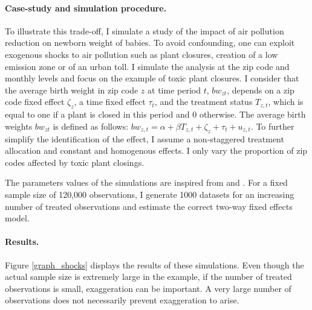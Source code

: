 \documentclass[usletter, 12pt]{article}
\begin{document}
			\paragraph{Case-study and simulation procedure.} %
			To illustrate this trade-off, I simulate a study of the impact of air pollution reduction on newborn weight of babies. To avoid confounding, one can exploit exogenous shocks to air pollution such as plant closures, creation of a low emission zone or of an urban toll. I simulate the analysis at the zip code and monthly levels and focus on the example of toxic plant closures. I consider that the average birth weight in zip code $z$ at time period $t$, $bw_{zt}$, depends on a zip code fixed effect $\zeta_z$, a time fixed effect $\tau_t$, and the treatment status $T_{z,t}$, which is equal to one if a plant is closed in this period and 0 otherwise. The average birth weights $bw_{zt}$ is defined as follows: $bw_{z,t} = \alpha + \beta T_{z, t} + \zeta_z + \tau_t + u_{z,t}$. To further simplify the identification of the effect, I assume a non-staggered treatment allocation and constant and homogenous effects. I only vary the proportion of zip codes affected by toxic plant closings.

       The parameters values of the simulations are inspired from \cite{currie_environmental_2015} and \cite{lavaine_energy_2017}. For a fixed sample size of 120,000 observations, I generate 1000 datasets for an increasing number of treated observations and estimate the correct two-way fixed effects model.
        
			\paragraph{Results.} Figure \ref{graph_shocks} displays the results of these simulations. Even though the actual sample size is extremely large in the example, if the number of treated observations is small, exaggeration can be important. A very large number of observations does not necessarily prevent exaggeration to arise.  
\end{document}
